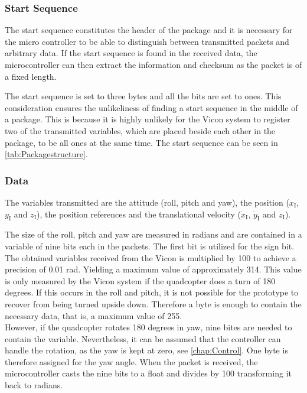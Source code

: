 \subsubsection{Start Sequence}
The start sequence constitutes the header of the package and it is necessary for the micro controller to be able to distinguish between transmitted packets and arbitrary data. %
If the start sequence is found in the received data, the microcontroller can then extract the information and checksum as the packet is of a fixed length. 

The start sequence is set to three bytes and all the bits are set to ones. This consideration ensures the unlikeliness of finding a start sequence in the middle of a package. This is because it is highly unlikely for the Vicon system to register two of the transmitted variables, which are placed beside each other in the package, to be all ones at the same time. The start sequence can be seen in \autoref{tab:Packagestructure}.

\subsubsection{Data}
The variables transmitted are the attitude (roll, pitch and yaw), the position ($x_{\mathrm{I}}$, $y_{\mathrm{I}}$ and $z_{\mathrm{I}}$), the position references and the translational velocity ($\dot{x}_{\mathrm{I}}$, $\dot{y}_{\mathrm{I}}$ and $\dot{z}_{\mathrm{I}}$).

The size of the roll, pitch and yaw are measured in radians and are contained in a variable of nine bits each in the packets. The first bit is utilized for the sign bit. The obtained variables received from the Vicon is multiplied by 100 to achieve a precision of 0.01 rad. Yielding a maximum value of approximately 314. This value is only measured by the Vicon system if the quadcopter does a turn of 180 degrees. If this occurs in the roll and pitch, it is not possible for the prototype to recover from being turned upside down. Therefore a byte is enough to contain the necessary data, that is, a maximum value of 255. \\ However, if the quadcopter rotates 180 degrees in yaw, nine bites are needed to contain the variable. Nevertheless, it can be assumed that the controller can handle the rotation, as the yaw is kept at zero, see \autoref{chap:Control}. One byte is therefore assigned for the yaw angle. When the packet is received, the microcontroller casts the nine bits to a float and divides by 100 transforming it back to radians.

